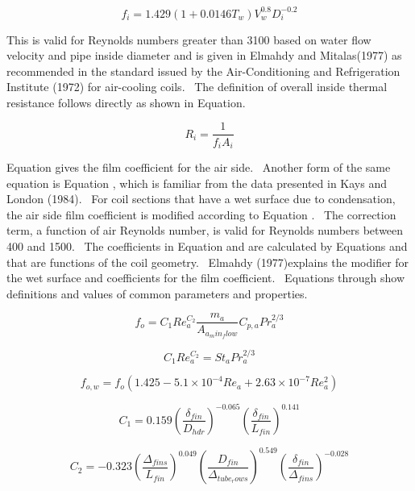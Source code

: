 \begin{equation}
{f_i} = 1.429\left( {1 + 0.0146 {T_w}} \right)V_w^{0.8}D_i^{ - 0.2}
\end{equation}

This is valid for Reynolds numbers greater than 3100 based on water flow velocity and pipe inside diameter and is given in Elmahdy and Mitalas(1977) as recommended in the standard issued by the Air-Conditioning and Refrigeration Institute (1972) for air-cooling coils.~ The definition of overall inside thermal resistance follows directly as shown in Equation.

\begin{equation}
{R_i} = \frac{1}{{{f_i}{A_i}}}
\end{equation}

Equation gives the film coefficient for the air side.~ Another form of the same equation is Equation , which is familiar from the data presented in Kays and London (1984).~ For coil sections that have a wet surface due to condensation, the air side film coefficient is modified according to Equation .~ The correction term, a function of air Reynolds number, is valid for Reynolds numbers between 400 and 1500.~ The coefficients in Equation and are calculated by Equations and that are functions of the coil geometry.~ Elmahdy (1977)explains the modifier for the wet surface and coefficients for the film coefficient.~ Equations through show definitions and values of common parameters and properties.

\begin{equation}
  f_o = C_1 Re_a^{C_2} \frac{m_a}{A_{a_min_flow}} C_{p,a} Pr_a^{2/3}
\end{equation}

\begin{equation}
  C_1 Re_a^{C_2} = St_a Pr_a^{2/3}
\end{equation}

\begin{equation}
{f_{o,w}} = {f_o}\left( {1.425 - 5.1 \times {{10}^{ - 4}}R{e_a} + 2.63 \times {{10}^{ - 7}}Re_a^2} \right)
\end{equation}

\begin{equation}
{C_1} = 0.159{\left( {\frac{{{\delta_{fin}}}}{{{D_{hdr}}}}} \right)^{ - 0.065}}{\left( {\frac{{{\delta_{fin}}}}{{{L_{fin}}}}} \right)^{0.141}}
\end{equation}

\begin{equation}
{C_2} =  - 0.323{\left( {\frac{{{\Delta_{fins}}}}{{{L_{fin}}}}} \right)^{0.049}}{\left( {\frac{{{D_{fin}}}}{{{\Delta_{tube_rows}}}}} \right)^{0.549}}{\left( {\frac{{{\delta_{fin}}}}{{{\Delta_{fins}}}}} \right)^{ - 0.028}}
\end{equation}


